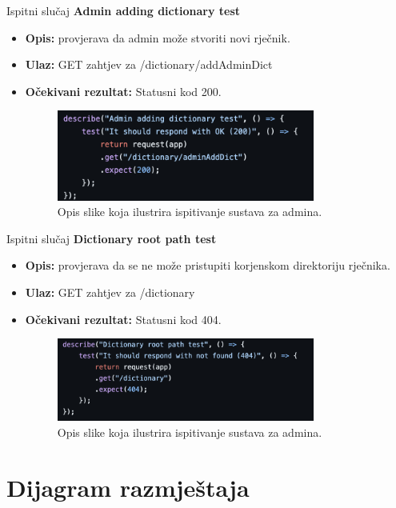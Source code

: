 			Ispitni slučaj \textbf{Admin adding dictionary test}
			\begin{itemize}
				\item \textbf{Opis:} provjerava da admin može stvoriti novi rječnik.
				\item \textbf{Ulaz:} GET zahtjev za /dictionary/addAdminDict
				\item \textbf{Očekivani rezultat:} Statusni kod 200.
				\begin{figure}[h]
					\centering
					\includegraphics[width=0.8\textwidth]{slike/testovi/admin_add_dictionary_test.png}
					\caption{Opis slike koja ilustrira ispitivanje sustava za admina.}
					\label{fig:testovi_admin_slika}
				\end{figure}
			\end{itemize}

			Ispitni slučaj \textbf{Dictionary root path test}
			\begin{itemize}
				\item \textbf{Opis:} provjerava da se ne može pristupiti korjenskom direktoriju rječnika.
				\item \textbf{Ulaz:} GET zahtjev za /dictionary
				\item \textbf{Očekivani rezultat:} Statusni kod 404.
				\begin{figure}[h]
					\centering
					\includegraphics[width=0.8\textwidth]{slike/testovi/admin_404_test.png}
					\caption{Opis slike koja ilustrira ispitivanje sustava za admina.}
					\label{fig:testovi_admin_slika}
				\end{figure}
			\end{itemize}
			
			\eject 
		
		
		\section{Dijagram razmještaja}
			
